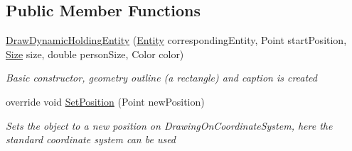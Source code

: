 \subsection*{Public Member Functions}
\begin{DoxyCompactItemize}
\item 
\hyperlink{class_simulation_w_p_f_visualization_tools_1_1_health_care_objects_1_1_draw_dynamic_holding_entity_adb7d2cf64457574caa927e48e26f1b70}{Draw\+Dynamic\+Holding\+Entity} (\hyperlink{class_simulation_core_1_1_h_c_c_m_elements_1_1_entity}{Entity} corresponding\+Entity, Point start\+Position, \hyperlink{class_simulation_w_p_f_visualization_tools_1_1_health_care_objects_1_1_draw_dynamic_holding_entity_a0090bc66182a727ad5a89b2775e91cf5}{Size} size, double person\+Size, Color color)
\begin{DoxyCompactList}\small\item\em Basic constructor, geometry outline (a rectangle) and caption is created \end{DoxyCompactList}\item 
override void \hyperlink{class_simulation_w_p_f_visualization_tools_1_1_health_care_objects_1_1_draw_dynamic_holding_entity_a495764090deca8f31d3c6e11bd67c6f5}{Set\+Position} (Point new\+Position)
\begin{DoxyCompactList}\small\item\em Sets the object to a new position on Drawing\+On\+Coordinate\+System, here the standard coordinate system can be used \end{DoxyCompactList}\end{DoxyCompactItemize}

